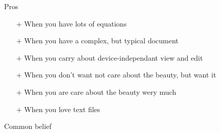 \begin{frame}{Pros}\relax
     \begin{itemize}
        \item[$+$] When you have lots of {\csk equations} %
        \item[$+$] When you have a {\csk complex, but typical} document %
        \item[$+$] When you carry about {\csk device-independant} view and edit %
        \item[$+$] When you don't want {\csk not care about the beauty}, but want it%
        \item[$+$] When you are {\csk care about the beauty} wery much%
        \item[$+$] When you {\csk love text files} 
    \end{itemize}
\end{frame}


\begin{frame}{Common belief}\relax
    \begin{center}
         
    \end{center}
\end{frame}

